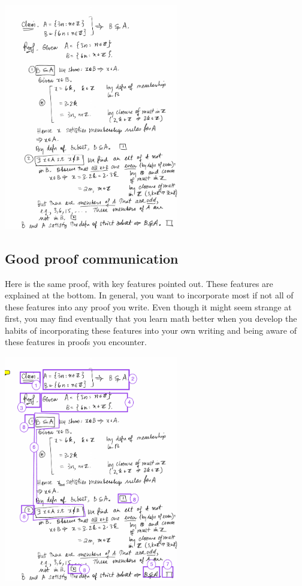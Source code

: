 \documentclass[11pt]{article}
\theoremstyle{definition}
\begin{document}
\begin{mdframed}\begin{center}
\includegraphics[width=3in]{0_SampleProof.pdf}
\end{center}
\end{mdframed}



\newpage
\subsection{Good proof communication}
\label{s: good proof communication}

Here is the same proof, with key features pointed out. These features are explained at the bottom. In general, you want to incorporate most if not all of these features into any proof you write. Even though it might seem strange at first, you may find eventually that you learn math better when you develop the habits of incorporating these features into your own writing and being aware of these features in proofs you encounter.

\begin{mdframed}
\begin{center}
\includegraphics[width=3in]{0_SampleProof_Annotated.pdf}
\end{center}
\end{mdframed}
\end{document}
